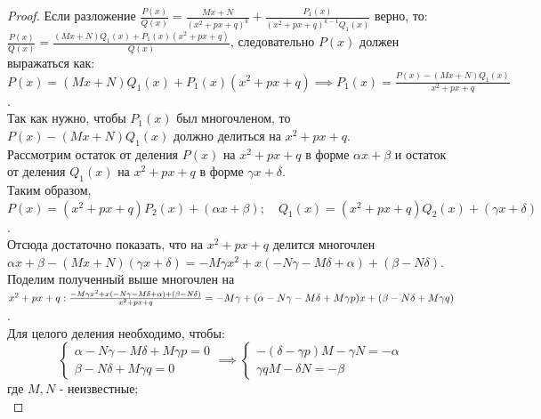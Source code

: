 \documentclass{report}
\theoremstyle{definition}
\begin{document}
\begin{proof}
  Если разложение $\frac{P(x)}{Q(x)} = \frac{Mx + N}{(x^{2} + px + q)^{k}} + \frac{P_{1}(x)}
    {(x^{2} + px + q)^{k-1}Q_{1}(x)}$ верно, то: $\frac{P(x)}{Q(x)} = \frac{(Mx + N)Q_{1}(x) + P_{1}(x)
      (x^{2} + px + q)}{Q(x)}$, следовательно $P(x)$ должен выражаться как: $P(x) = (Mx + N)Q_{1}(x) +
    P_{1}(x)(x^{2} + px + q) \implies P_{1}(x) = \frac{P(x) - (Mx + N)Q_{1}(x)}{x^{2} + px + q}$. \\

  Так как нужно, чтобы $P_{1}(x)$ был многочленом, то $P(x) - (Mx + N)Q_{1}(x)$ должно делиться на
  $x^{2} + px + q$. \\

  Рассмотрим остаток от деления $P(x)$ на $x^{2} + px + q$ в форме $\alpha x + \beta$ и остаток от деления
  $Q_{1}(x)$ на $x^{2} + px + q$ в форме $\gamma x + \delta$. \\

  Таким образом, $P(x) = (x^{2} + px + q) P_{2}(x) + (\alpha x + \beta); \quad Q_{1}(x) = (x^{2} + px + q)
    Q_{2}(x) + (\gamma x + \delta)$. \\

  Отсюда достаточно показать, что на $x^{2} + px + q$ делится многочлен $\alpha x + \beta - (Mx + N)
    (\gamma x + \delta) = -M\gamma x^{2} + x(-N\gamma - M\delta + \alpha) + (\beta - N\delta)$. \\

  Поделим полученный выше многочлен на $x^{2} + px + q: \\ \frac{-M\gamma x^{2} + x(-N\gamma - M\delta + \alpha)
      + (\beta - N\delta)}{x^{2} + px + q} = -M\gamma + (\alpha - N\gamma - M\delta + M\gamma p)x + \\
    (\beta - N\delta + M\gamma q)$. \\

  Для целого деления необходимо, чтобы: \\
  \begin{equation*}
    \left\{
    \begin{array}{ll}
      \alpha - N\gamma - M\delta + M\gamma p = 0 \\
      \beta - N\delta + M\gamma q = 0
    \end{array}
    \right. \implies
    \left\{
    \begin{array}{ll}
      -(\delta - \gamma p)M - \gamma N = - \alpha \\
      \gamma qM - \delta N = -\beta
    \end{array}
    \right.
  \end{equation*}
  где $M, N$ - неизвестные; \\


\end{proof}
\end{document}
